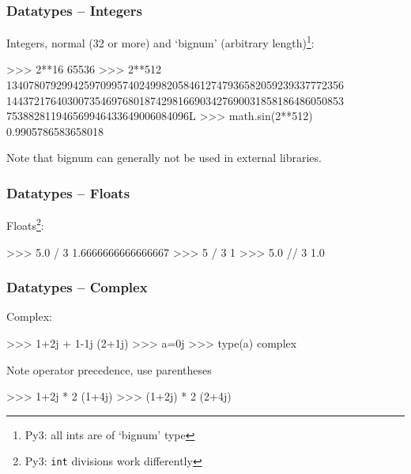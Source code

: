\documentclass[xetex,10pt]{beamer}
\def\pythoni{\lstinline[language=pythontim]}
\def\spacer{\vspace*{1em}}
\newcommand{\pypypy}[1]{\footnote[frame]{Py3: #1}}
\begin{document}
\begin{frame}[fragile]
	\frametitle{Datatypes -- Integers}

	Integers, normal (32 or more) and `bignum' (arbitrary length)\pypypy{all ints are of `bignum' type}:

	\spacer

\begin{python}
>>> 2**16
65536
>>> 2**512
1340780792994259709957402499820584612747936582059239337772356
1443721764030073546976801874298166903427690031858186486050853
753882811946569946433649006084096L
>>> math.sin(2**512)
0.9905786583658018
\end{python}

	\spacer

Note that bignum can generally not be used in external libraries.
\end{frame}


\begin{frame}[fragile]
	\frametitle{Datatypes -- Floats}

Floats\pypypy{\pythoni{int} divisions work differently}:
\begin{python}
>>> 5.0 / 3
1.6666666666666667
>>> 5 / 3
1
>>> 5.0 // 3
1.0
\end{python}
\end{frame}


\begin{frame}[fragile]
	\frametitle{Datatypes -- Complex}

Complex:
\begin{python}
>>> 1+2j + 1-1j
(2+1j)
>>> a=0j
>>> type(a)
complex
\end{python}

\spacer

Note operator precedence, use parentheses
\begin{python}
>>> 1+2j * 2
(1+4j)
>>> (1+2j) * 2
(2+4j)
\end{python}

\end{frame}
\end{document}
